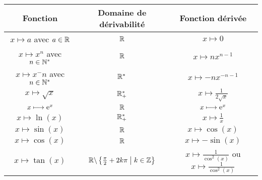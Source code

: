 \begin{defprop}
    ~\\
	\begin{tabular}{|c|c|c|}

		\hline
		\textbf{Fonction}                    & \textbf{Domaine de dérivabilité}                 & \textbf{Fonction dérivée}                                             \\
		\hline
		\(x\mapsto a\) avec \(a \in \mathbb{R}\)     & \(\mathbb{R}\)                                            & \(x\mapsto 0\)                                                        \\
		\hline
		\(x\mapsto x^n\) avec \(n \in \mathbb{N}^*\)  & \(\mathbb{R}\)                                            & \(x\mapsto nx^{n-1}\)                                                 \\
		\hline
		\(x\mapsto x^-n\) avec \(n \in \mathbb{N}^*\) & \(\mathbb{R}^*\)                                           & \(x\mapsto -nx^{-n-1}\)                                               \\
		\hline
		\(x\mapsto \sqrt{x}\)                & \(\mathbb{R}_+^*\)                                          & \(x\mapsto \frac{1}{2\sqrt{x}}\)                                      \\
		\hline
		\(x\longmapsto \mathrm{e}^{x}\)                   & \(\mathbb{R}\)                                            & \(x\longmapsto \mathrm{e}^{x}\)                                                    \\
		\hline
		\(x\mapsto \ln(x)\)                  & \(\mathbb{R}_+^*\)                                          & \(x\mapsto \frac{1}{x}\)                                              \\
		\hline
		\(x\mapsto \sin(x)\)                 & \(\mathbb{R}\)                                            & \(x\mapsto \cos(x)\)                                                  \\
		\hline
		\(x\mapsto \cos(x)\)                 & \(\mathbb{R}\)                                            & \(x\mapsto -\sin(x)\)                                                 \\
		\hline
		\(x\mapsto \tan(x)\)                 & \(\mathbb{R}\backslash\left\lbrace\frac{\pi}{2}+2k\pi \;\middle|\; k \in \mathbb{Z}\right\rbrace\) & \(x\mapsto \frac{1}{\cos^2(x)} \) ou \(x\mapsto \frac{1}{\cos^2(x)}\) \\
		\hline
	\end{tabular}



\end{defprop}


